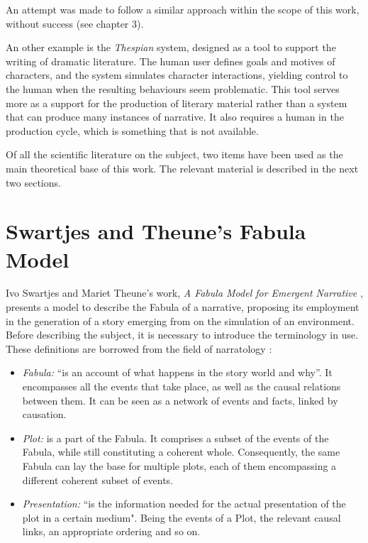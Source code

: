 \documentclass[12pt,a4paper,oneside]{report}
\begin{document}
An attempt was made to follow a similar approach within the scope of this work, without success (see chapter 3).

\bigskip

An other example is the \textit{Thespian} \cite{thespian} system, designed as a tool to support the writing of dramatic literature. The human user defines goals and motives of characters, and the system simulates character interactions, yielding control to the human when the resulting behaviours seem problematic. This tool serves more as a support for the production of literary material rather than a system that can produce many instances of narrative. It also requires a human in the production cycle, which is something that is not available.

\bigskip

Of all the scientific literature on the subject, two items have been used as the main theoretical base of this work. The relevant material is described in the next two sections.

\pagebreak

\section{Swartjes and Theune's Fabula Model}
Ivo Swartjes and Mariet Theune's work, \textit{A Fabula Model for Emergent Narrative} \cite{swartje}, presents a model to describe the Fabula of a narrative, proposing its employment in the generation of a story emerging from on the simulation of an environment. Before describing the subject, it is necessary to introduce the  terminology in use. These definitions are borrowed from the field of narratology \cite{bal85}:

\begin{itemize}\setlength{\itemsep}{0pt}
\item \textit{Fabula:} ``is an account of what happens in the story world and why''. It encompasses all the events that take place, as well as the causal relations between them.  It can be seen as a network of events and facts, linked by causation.
\item \textit{Plot:} is a part of the Fabula. It comprises a subset of the events of the Fabula, while still constituting a coherent whole. Consequently, the same Fabula can lay the base for multiple plots, each of them encompassing a different coherent subset of events.
\item \textit{Presentation:} ``is the information needed for the actual presentation of the plot in a certain medium". Being the events of a Plot, the relevant causal links, an appropriate ordering and so on.
\end{itemize}
\end{document}
